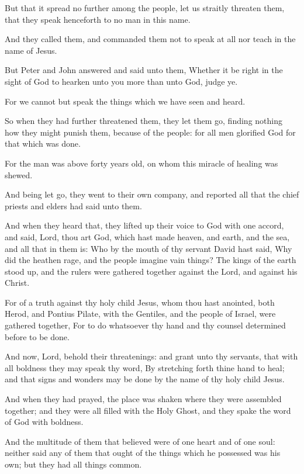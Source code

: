 \verse But that it spread no further among the people, let us straitly threaten them, that they speak henceforth to no man in this name.

\verse And they called them, and commanded them not to speak at all nor teach in the name of Jesus.

\verse But Peter and John answered and said unto them, Whether it be right in the sight of God to hearken unto you more than unto God, judge ye.

\verse For we cannot but speak the things which we have seen and heard.

\verse So when they had further threatened them, they let them go, finding nothing how they might punish them, because of the people: for all men glorified God for that which was done.

\verse For the man was above forty years old, on whom this miracle of healing was shewed.

\verse And being let go, they went to their own company, and reported all that the chief priests and elders had said unto them.

\verse And when they heard that, they lifted up their voice to God with one accord, and said, Lord, thou art God, which hast made heaven, and earth, and the sea, and all that in them is: \verse Who by the mouth of thy servant David hast said, Why did the heathen rage, and the people imagine vain things?  \verse The kings of the earth stood up, and the rulers were gathered together against the Lord, and against his Christ.

\verse For of a truth against thy holy child Jesus, whom thou hast anointed, both Herod, and Pontius Pilate, with the Gentiles, and the people of Israel, were gathered together, \verse For to do whatsoever thy hand and thy counsel determined before to be done.

\verse And now, Lord, behold their threatenings: and grant unto thy servants, that with all boldness they may speak thy word, \verse By stretching forth thine hand to heal; and that signs and wonders may be done by the name of thy holy child Jesus.

\verse And when they had prayed, the place was shaken where they were assembled together; and they were all filled with the Holy Ghost, and they spake the word of God with boldness.

\verse And the multitude of them that believed were of one heart and of one soul: neither said any of them that ought of the things which he possessed was his own; but they had all things common.


